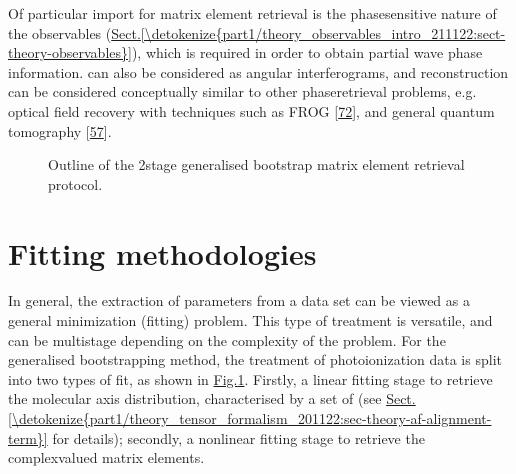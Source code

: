\documentclass[letterpaper,table,10pt,english]{jupyterBook}
\begin{document}
\sphinxAtStartPar
Of particular import for matrix element retrieval is the phase\sphinxhyphen{}sensitive nature of the observables (\hyperref[\detokenize{part1/theory_observables_intro_211122:sect-theory-observables}]{Sect.\@ \ref{\detokenize{part1/theory_observables_intro_211122:sect-theory-observables}}}), which is required in order to obtain partial wave phase information. {\hyperref[\detokenize{backmatter/glossary:term-PADs}]{}} can also be considered as angular interferograms, and reconstruction can be considered conceptually similar to other phase\sphinxhyphen{}retrieval problems, e.g. optical field recovery with techniques such as FROG {[}\hyperlink{cite.backmatter/bibliography:id834}{72}{]}, and general quantum tomography {[}\hyperlink{cite.backmatter/bibliography:id707}{57}{]}.

\begin{figure}[htbp]
\centering
\capstart

\noindent{}
\caption{Outline of the 2\sphinxhyphen{}stage generalised bootstrap matrix element retrieval protocol.}\label{\detokenize{part1/numerics_231122:fig-bootstrap-fitting-diag}}\end{figure}


\section{Fitting methodologies}
\label{\detokenize{part1/numerics_231122:fitting-methodologies}}
\sphinxAtStartPar
In general, the extraction of parameters from a data set can be viewed as a general minimization (fitting) problem. This type of treatment is versatile, and can be multi\sphinxhyphen{}stage depending on the complexity of the problem. For the generalised bootstrapping method, the treatment of photoionization data is split into two types of fit, as shown in \hyperref[\detokenize{part1/numerics_231122:fig-bootstrap-fitting-diag}]{Fig.\@ \ref{\detokenize{part1/numerics_231122:fig-bootstrap-fitting-diag}}}. Firstly, a linear fitting stage to retrieve the molecular axis distribution, characterised by a set of {\hyperref[\detokenize{backmatter/glossary:term-ADMs}]{}} (see \hyperref[\detokenize{part1/theory_tensor_formalism_201122:sec-theory-af-alignment-term}]{Sect.\@ \ref{\detokenize{part1/theory_tensor_formalism_201122:sec-theory-af-alignment-term}}} for details); secondly, a non\sphinxhyphen{}linear fitting stage to retrieve the complex\sphinxhyphen{}valued matrix elements.
\end{document}
